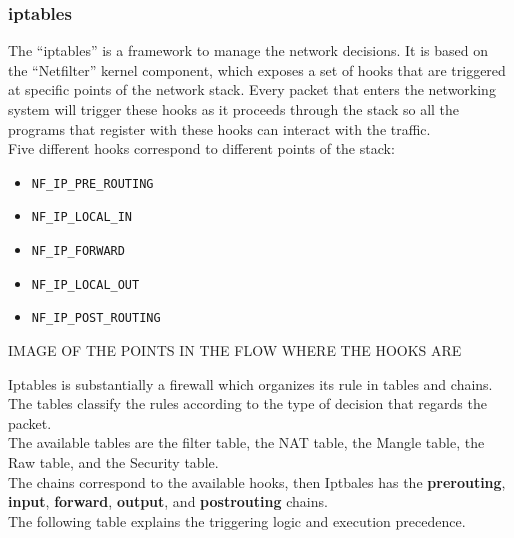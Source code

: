 \documentclass[]{article}
\begin{document}
	\subsubsection{iptables}

	The ``iptables'' is a framework to manage the network decisions. It is based on the ``Netfilter'' kernel component, which exposes a set of hooks that are triggered at specific points of the network stack. Every packet that enters the networking system will trigger these hooks as it proceeds through the stack so all the programs that register with these hooks can interact with the traffic.\\
	Five different hooks correspond to different points of the stack:\\

	\begin{itemize}
		\item \lstinline{NF_IP_PRE_ROUTING}
		\item \lstinline{NF_IP_LOCAL_IN}
		\item \lstinline{NF_IP_FORWARD}
		\item \lstinline{NF_IP_LOCAL_OUT}
		\item \lstinline{NF_IP_POST_ROUTING}
	\end{itemize}

	IMAGE OF THE POINTS IN THE FLOW WHERE THE HOOKS ARE
	
	Iptables is substantially a firewall which organizes its rule in tables and chains. The tables classify the rules according to the type of decision that regards the packet.\\
	The available tables are the filter table, the NAT table, the Mangle table, the Raw table, and the Security table.\\
	The chains correspond to the available hooks, then Iptbales has the \textbf{prerouting}, \textbf{input}, \textbf{forward}, \textbf{output}, and \textbf{postrouting} chains.\\
	The following table explains the triggering logic and execution precedence.\\
\end{document}
